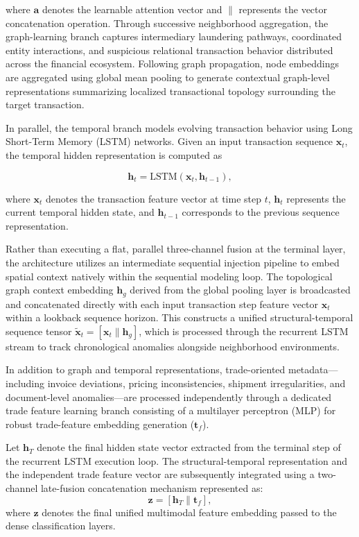 \documentclass[conference]{IEEEtran}
\begin{document}
where \(\mathbf{a}\) denotes the learnable attention vector and \(\parallel\) represents the vector concatenation operation. Through successive neighborhood aggregation, the graph-learning branch captures intermediary laundering pathways, coordinated entity interactions, and suspicious relational transaction behavior distributed across the financial ecosystem. Following graph propagation, node embeddings are aggregated using global mean pooling to generate contextual graph-level representations summarizing localized transactional topology surrounding the target transaction.

In parallel, the temporal branch models evolving transaction behavior using Long Short-Term Memory (LSTM) networks. Given an input transaction sequence \(\mathbf{x}_t\), the temporal hidden representation is computed as

\begin{equation}
\mathbf{h}_t =
\text{LSTM}
(
\mathbf{x}_t,
\mathbf{h}_{t-1}
),
\label{eq:lstm}
\end{equation}

where \(\mathbf{x}_t\) denotes the transaction feature vector at time step \(t\), \(\mathbf{h}_t\) represents the current temporal hidden state, and \(\mathbf{h}_{t-1}\) corresponds to the previous sequence representation.

Rather than executing a flat, parallel three-channel fusion at the terminal layer, the architecture utilizes an intermediate sequential injection pipeline to embed spatial context natively within the sequential modeling loop. The topological graph context embedding $\mathbf{h}_g$ derived from the global pooling layer is broadcasted and concatenated directly with each input transaction step feature vector $\mathbf{x}_t$ within a lookback sequence horizon. This constructs a unified structural-temporal sequence tensor $\tilde{\mathbf{x}}_t = [\mathbf{x}_t \parallel \mathbf{h}_g]$, which is processed through the recurrent LSTM stream to track chronological anomalies alongside neighborhood environments. 

In addition to graph and temporal representations, trade-oriented metadata—including invoice deviations, pricing inconsistencies, shipment irregularities, and document-level anomalies—are processed independently through a dedicated trade feature learning branch consisting of a multilayer perceptron (MLP) for robust trade-feature embedding generation ($\mathbf{t}_f$).

Let $\mathbf{h}_T$ denote the final hidden state vector extracted from the terminal step of the recurrent LSTM execution loop. The structural-temporal representation and the independent trade feature vector are subsequently integrated using a two-channel late-fusion concatenation mechanism represented as:
\begin{equation}
\mathbf{z} = [\mathbf{h}_T \parallel \mathbf{t}_f],
\label{eq:fusion}
\end{equation}
where $\mathbf{z}$ denotes the final unified multimodal feature embedding passed to the dense classification layers.
\end{document}
